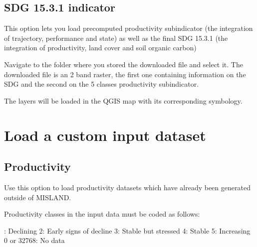 \documentclass[letterpaper,10pt,english]{sphinxmanual}
\begin{document}
\subsection{SDG 15.3.1 indicator}
\label{\detokenize{Qgis_Plugin/load_data:sdg-15-3-1-indicator}}
\sphinxAtStartPar
This option lets you load pre\sphinxhyphen{}computed productivity subindicator (the integration of trajectory,
performance and state) as well as the final SDG 15.3.1 (the integration of productivity,
land cover and soil organic carbon)

\sphinxAtStartPar
Navigate to the folder where you stored the downloaded file and select it. The downloaded file is an 2 band raster, the first one
containing information on the SDG and the second on the 5 classes productivity subindicator.


\sphinxAtStartPar
The layers will be loaded in the QGIS map with its corresponding symbology.



\section{Load a custom input dataset}
\label{\detokenize{Qgis_Plugin/load_data:load-a-custom-input-dataset}}

\subsection{Productivity}
\label{\detokenize{Qgis_Plugin/load_data:id1}}
\sphinxAtStartPar
Use this option to load productivity datasets which have already been generated outside of MISLAND.

\sphinxAtStartPar
Productivity classes in the input data must be coded as follows:

: Declining
2: Early signs of decline
3: Stable but stressed
4: Stable
5: Increasing
0 or \sphinxhyphen{}32768: No data

\end{document}
